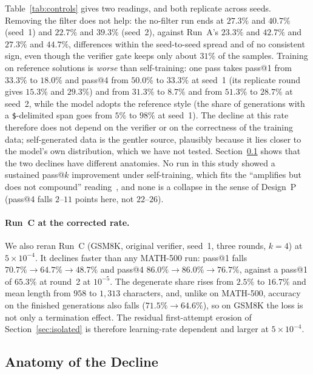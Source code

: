 \documentclass[runningheads]{llncs}
\begin{document}
Table~\ref{tab:controls} gives two readings, and both replicate across seeds.
Removing the filter does not help: the no-filter run ends at $27.3\%$ and $40.7\%$
(seed~1) and $22.7\%$ and $39.3\%$ (seed~2), against Run~A's $23.3\%$ and
$42.7\%$ and $27.3\%$ and $44.7\%$, differences within the seed-to-seed spread
and of no consistent sign, even though the verifier gate keeps only about $31\%$ of
the samples. Training on reference solutions is \emph{worse} than self-training:
one pass takes pass@1 from $33.3\%$ to $18.0\%$ and pass@4 from $50.0\%$ to
$33.3\%$ at seed~1 (its replicate round gives $15.3\%$ and $29.3\%$) and from
$31.3\%$ to $8.7\%$ and from $51.3\%$ to $28.7\%$ at seed~2, while the model adopts
the reference style (the share of generations with a \texttt{\$}-delimited span
goes from $5\%$ to $98\%$ at seed~1). The decline at this rate
therefore does not depend on the verifier or on the correctness of the training
data; self-generated data is the gentler source, plausibly because it lies closer
to the model's own distribution, which we have not tested. Section~\ref{sec:anatomy}
shows that the two declines have different anatomies. No run in this study showed
a sustained pass@$k$ improvement under self-training, which fits the ``amplifies
but does not compound'' reading~\cite{ref_teacherfree}, and none is a collapse in
the sense of Design~P (pass@4 falls $2$--$11$ points here, not $22$--$26$).

\paragraph{Run~C at the corrected rate.}
We also reran Run~C (GSM8K, original verifier, seed~1, three rounds, $k=4$) at
$5\times10^{-4}$. It declines faster than any MATH-500 run: pass@1 falls
$70.7\%\to64.7\%\to48.7\%$ and pass@4 $86.0\%\to86.0\%\to76.7\%$, against a pass@1
of $65.3\%$ at round~2 at $10^{-5}$. The degenerate share rises from $2.5\%$ to
$16.7\%$ and mean length from $958$ to $1{,}313$ characters, and, unlike on
MATH-500, accuracy on the finished generations also falls ($71.5\%\to64.6\%$), so
on GSM8K the loss is not only a termination effect. The residual first-attempt
erosion of Section~\ref{sec:isolated} is therefore learning-rate dependent and
larger at $5\times10^{-4}$.

\subsection{Anatomy of the Decline}
\label{sec:anatomy}
\end{document}
